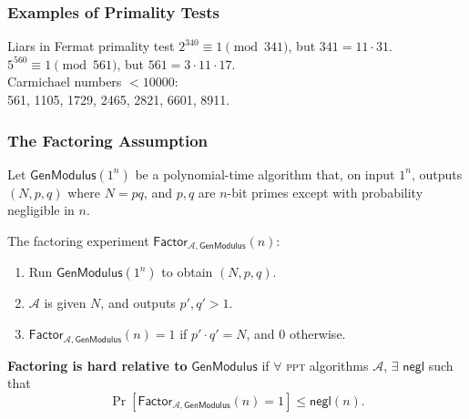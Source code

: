 \begin{frame}\frametitle{Examples of Primality Tests}
\begin{exampleblock}{Liars in Fermat primality test}
$2^{340} \equiv 1 \pmod {341}$,  but $341 = 11\cdot 31$.\\  
$5^{560} \equiv 1 \pmod {561}$,  but $561 = 3\cdot 11\cdot 17$.\\
Carmichael numbers $< 10000$: \\  
561,  1105,  1729,  2465,  2821,  6601,  8911.
\end{exampleblock}

\end{frame}
\begin{frame}\frametitle{The Factoring Assumption}
Let $\mathsf{GenModulus}(1^n)$ be a polynomial-time algorithm that, on input $1^n$, outputs $(N,p,q)$ where $N=pq$, and $p,q$ are $n$-bit primes except with probability negligible in $n$.
\newline

The factoring experiment $\mathsf{Factor}_{\mathcal{A},\mathsf{GenModulus}}(n)$:
\begin{enumerate}
\item Run $\mathsf{GenModulus}(1^n)$ to obtain $(N,p,q)$.
\item $\mathcal{A}$ is given $N$, and outputs $p', q'>1$.
\item $\mathsf{Factor}_{\mathcal{A},\mathsf{GenModulus}}(n) = 1$ if $p'\cdot q'=N$, and 0 otherwise.
\end{enumerate}
\begin{definition}
\textbf{Factoring is hard relative to} $\mathsf{GenModulus}$ if $\forall$ \textsc{ppt} algorithms $\mathcal{A}$, $\exists$ $\mathsf{negl}$ such that
\[ \Pr[\mathsf{Factor}_{\mathcal{A},\mathsf{GenModulus}}(n) = 1] \le \mathsf{negl}(n).\] 
\end{definition}
\end{frame}
